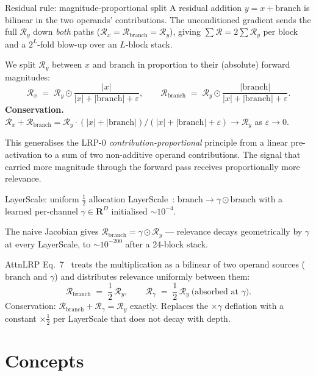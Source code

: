 \documentclass[
  aspectratio=169,
]{beamer}
\newcommand{\eps}{\varepsilon}
\newcommand{\Rel}{\mathcal{R}}
\newcommand{\half}{\frac{1}{2}}
\newcommand{\reals}{\mathbf{R}}
\begin{document}
\begin{frame}{Residual rule: magnitude-proportional split}
A residual addition $y = x + \mathrm{branch}$ is bilinear in the two
operands' contributions. The unconditioned gradient sends the full
$\Rel_y$ down \emph{both} paths
($\Rel_x = \Rel_{\mathrm{branch}} = \Rel_y$), giving
$\sum\!\Rel = 2\sum\!\Rel_y$ per block and a $2^{L}$-fold blow-up
over an $L$-block stack.

We split $\Rel_y$ between $x$ and $\mathrm{branch}$ in proportion to
their (absolute) forward magnitudes:
\[
  \Rel_x \;=\; \Rel_y \odot \frac{|x|}{|x| + |\mathrm{branch}| + \eps},
  \qquad
  \Rel_{\mathrm{branch}} \;=\; \Rel_y \odot \frac{|\mathrm{branch}|}{|x| + |\mathrm{branch}| + \eps}.
\]
\smallskip
\textbf{Conservation.} $\Rel_x + \Rel_{\mathrm{branch}} = \Rel_y \cdot
(|x| + |\mathrm{branch}|)/(|x| + |\mathrm{branch}| + \eps) \to \Rel_y$
as $\eps \to 0$.

\smallskip
This generalises the LRP-0 \emph{contribution-proportional} principle
from a linear pre-activation to a sum of two non-additive operand
contributions. The signal that carried more magnitude through the
forward pass receives proportionally more relevance.
\end{frame}

\begin{frame}{LayerScale: uniform $\half$ allocation}
LayerScale~\cite{touvron2021cait}:
$\mathrm{branch} \to \gamma \odot \mathrm{branch}$ with a learned
per-channel $\gamma \in \reals^D$ initialised $\sim 10^{-4}$.

The naive Jacobian gives $\Rel_{\mathrm{branch}} = \gamma \odot \Rel_y$
— relevance decays geometrically by $\gamma$ at every LayerScale,
to $\sim 10^{-200}$ after a 24-block stack.

AttnLRP Eq.~7~\cite{achtibat2024attnlrp} treats the multiplication
as a bilinear of two operand sources ($\mathrm{branch}$ and $\gamma$)
and distributes relevance uniformly between them:
\[
  \Rel_{\mathrm{branch}} \;=\; \half\, \Rel_y,
  \qquad \Rel_{\gamma} \;=\; \half\, \Rel_y\ \text{(absorbed at $\gamma$).}
\]
Conservation: $\Rel_{\mathrm{branch}} + \Rel_\gamma = \Rel_y$ exactly.
Replaces the $\times\gamma$ deflation with a constant $\times\half$
per LayerScale that does not decay with depth.
\end{frame}

\section[Concepts]{Concepts}
\end{document}
